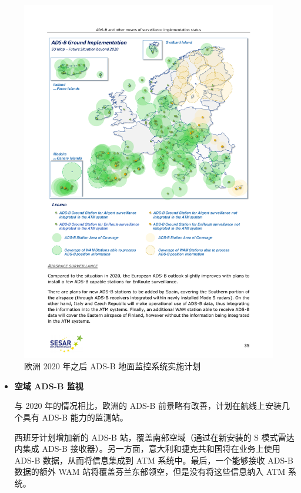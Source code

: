 \begin{itemize}
    \begin{figure}[htbp]
    \centering
    \includegraphics[width=15cm]{pic/20180515-sesar-ads-b-report_35.pdf}
    \caption{欧洲 2020 年之后 ADS-B 地面监控系统实施计划\protect\footnotemark}
    \label{fig:20180515-sesar-ads-b-report_35}
    \end{figure}


    \begin{itemize}
        \item \textbf{空域 ADS-B 监视}

        与 2020 年的情况相比，欧洲的 ADS-B 前景略有改善，计划在航线上安装几个具有 ADS-B 能力的监测站。

        西班牙计划增加新的 ADS-B 站，覆盖南部空域（通过在新安装的 S 模式雷达内集成 ADS-B 接收器）。另一方面，意大利和捷克共和国将在业务上使用 ADS-B 数据，从而将信息集成到 ATM 系统中。最后，一个能够接收 ADS-B 数据的额外 WAM 站将覆盖芬兰东部领空，但是没有将这些信息纳入 ATM 系统。


\end{itemize}
\end{itemize}
